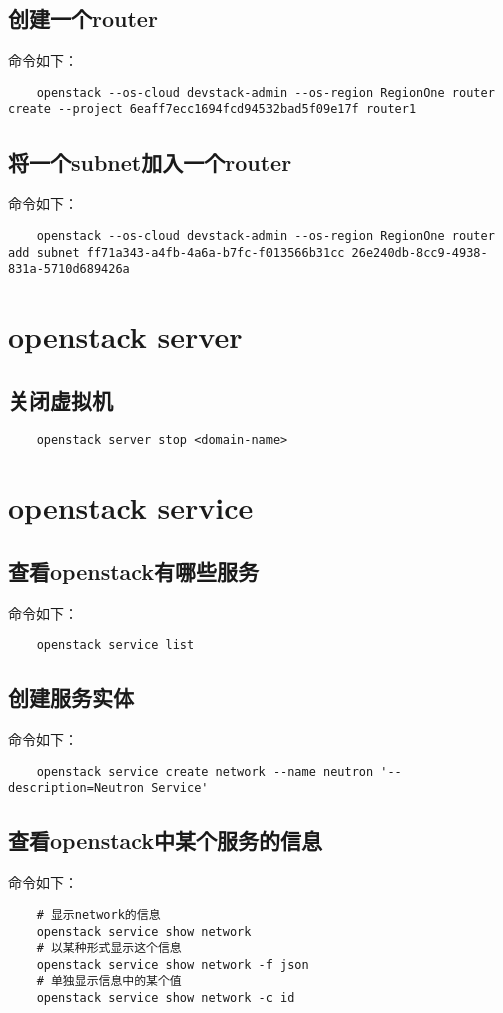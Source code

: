 \documentclass[a4paper,left=1.5cm,right=1.5cm,11pt]{article}
\begin{document}
\subsection{创建一个router}
	命令如下：
	\begin{lstlisting}
	openstack --os-cloud devstack-admin --os-region RegionOne router create --project 6eaff7ecc1694fcd94532bad5f09e17f router1
	\end{lstlisting}

\subsection{将一个subnet加入一个router}
	命令如下：
	\begin{lstlisting}
	openstack --os-cloud devstack-admin --os-region RegionOne router add subnet ff71a343-a4fb-4a6a-b7fc-f013566b31cc 26e240db-8cc9-4938-831a-5710d689426a
	\end{lstlisting}

\section{openstack server}
\subsection{关闭虚拟机}
	\begin{lstlisting}
	openstack server stop <domain-name>
	\end{lstlisting}

\section{openstack service}
\subsection{查看openstack有哪些服务}
	命令如下：
	\begin{lstlisting}
	openstack service list
	\end{lstlisting}

\subsection{创建服务实体}
	命令如下：
	\begin{lstlisting}
	openstack service create network --name neutron '--description=Neutron Service'
	\end{lstlisting}
	
\subsection{查看openstack中某个服务的信息}
	命令如下：
	\begin{lstlisting}
	# 显示network的信息
	openstack service show network
	# 以某种形式显示这个信息
	openstack service show network -f json
	# 单独显示信息中的某个值
	openstack service show network -c id
	\end{lstlisting}
\end{document}

